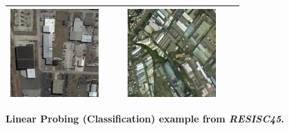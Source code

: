 \begin{figure}[h]
\begin{tabular}{|p{0.4\linewidth}p{0.4\linewidth}|}
\includegraphics[width=\linewidth,frame]{figures/examples_assests/linear_probing/industry_3.pdf} & 
\includegraphics[width=\linewidth,frame]{figures/examples_assests/linear_probing/industry_4.pdf}\\
\hline
\end{tabular}
\caption{\textbf{Linear Probing (Classification) example from \emph{RESISC45}.}}
\label{fig:linear_example}
\end{figure}